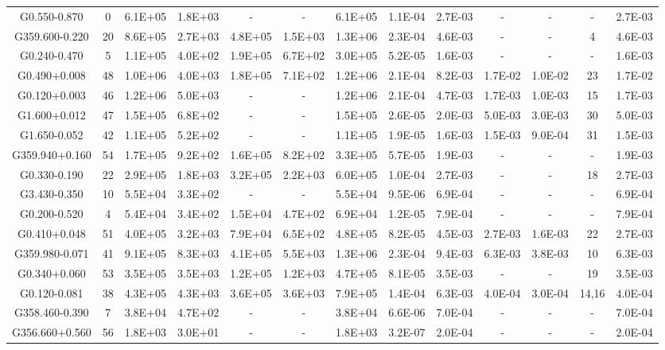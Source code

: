 \begin{table*}
\begin{tabular}{ccccccccccccc}
G0.550-0.870 & 0 & 6.1E+05 & 1.8E+03 & - & - & 6.1E+05 & 1.1E-04 & 2.7E-03 & - & - & - & 2.7E-03 \\
G359.600-0.220 & 20 & 8.6E+05 & 2.7E+03 & 4.8E+05 & 1.5E+03 & 1.3E+06 & 2.3E-04 & 4.6E-03 & - & - & 4 & 4.6E-03 \\
G0.240-0.470 & 5 & 1.1E+05 & 4.0E+02 & 1.9E+05 & 6.7E+02 & 3.0E+05 & 5.2E-05 & 1.6E-03 & - & - & - & 1.6E-03 \\
G0.490+0.008 & 48 & 1.0E+06 & 4.0E+03 & 1.8E+05 & 7.1E+02 & 1.2E+06 & 2.1E-04 & 8.2E-03 & 1.7E-02 & 1.0E-02 & 23 & 1.7E-02 \\
G0.120+0.003 & 46 & 1.2E+06 & 5.0E+03 & - & - & 1.2E+06 & 2.1E-04 & 4.7E-03 & 1.7E-03 & 1.0E-03 & 15 & 1.7E-03 \\
G1.600+0.012 & 47 & 1.5E+05 & 6.8E+02 & - & - & 1.5E+05 & 2.6E-05 & 2.0E-03 & 5.0E-03 & 3.0E-03 & 30 & 5.0E-03 \\
G1.650-0.052 & 42 & 1.1E+05 & 5.2E+02 & - & - & 1.1E+05 & 1.9E-05 & 1.6E-03 & 1.5E-03 & 9.0E-04 & 31 & 1.5E-03 \\
G359.940+0.160 & 54 & 1.7E+05 & 9.2E+02 & 1.6E+05 & 8.2E+02 & 3.3E+05 & 5.7E-05 & 1.9E-03 & - & - & - & 1.9E-03 \\
G0.330-0.190 & 22 & 2.9E+05 & 1.8E+03 & 3.2E+05 & 2.2E+03 & 6.0E+05 & 1.0E-04 & 2.7E-03 & - & - & 18 & 2.7E-03 \\
G3.430-0.350 & 10 & 5.5E+04 & 3.3E+02 & - & - & 5.5E+04 & 9.5E-06 & 6.9E-04 & - & - & - & 6.9E-04 \\
G0.200-0.520 & 4 & 5.4E+04 & 3.4E+02 & 1.5E+04 & 4.7E+02 & 6.9E+04 & 1.2E-05 & 7.9E-04 & - & - & - & 7.9E-04 \\
G0.410+0.048 & 51 & 4.0E+05 & 3.2E+03 & 7.9E+04 & 6.5E+02 & 4.8E+05 & 8.2E-05 & 4.5E-03 & 2.7E-03 & 1.6E-03 & 22 & 2.7E-03 \\
G359.980-0.071 & 41 & 9.1E+05 & 8.3E+03 & 4.1E+05 & 5.5E+03 & 1.3E+06 & 2.3E-04 & 9.4E-03 & 6.3E-03 & 3.8E-03 & 10 & 6.3E-03 \\
G0.340+0.060 & 53 & 3.5E+05 & 3.5E+03 & 1.2E+05 & 1.2E+03 & 4.7E+05 & 8.1E-05 & 3.5E-03 & - & - & 19 & 3.5E-03 \\
G0.120-0.081 & 38 & 4.3E+05 & 4.3E+03 & 3.6E+05 & 3.6E+03 & 7.9E+05 & 1.4E-04 & 6.3E-03 & 4.0E-04 & 3.0E-04 & 14,16 & 4.0E-04 \\
G358.460-0.390 & 7 & 3.8E+04 & 4.7E+02 & - & - & 3.8E+04 & 6.6E-06 & 7.0E-04 & - & - & - & 7.0E-04 \\
G356.660+0.560 & 56 & 1.8E+03 & 3.0E+01 & - & - & 1.8E+03 & 3.2E-07 & 2.0E-04 & - & - & - & 2.0E-04 \\

\end{tabular}
\end{table*}
